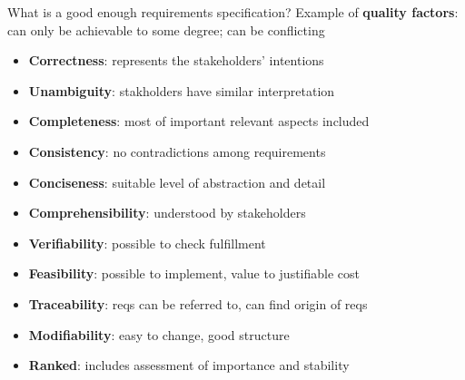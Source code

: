 
\begin{Slide}{What is a good enough requirements specification?}
Example of \textbf{quality factors}:\\can only be achievable to some degree; can be conflicting
\begin{itemize}
\item \textbf{Correctness}: represents the stakeholders' intentions
\item \textbf{Unambiguity}: stakholders have similar interpretation
\item \textbf{Completeness}: most of important relevant aspects included
\item \textbf{Consistency}: no contradictions among requirements
\item \textbf{Conciseness}: suitable level of abstraction and detail 
\item \textbf{Comprehensibility}: understood by stakeholders 
\item \textbf{Verifiability}: possible to check fulfillment 
\item \textbf{Feasibility}: possible to implement, value to justifiable cost 
\item \textbf{Traceability}: reqs can be referred to, can find origin of reqs
\item \textbf{Modifiability}: easy to change, good structure
\item \textbf{Ranked}: includes assessment of importance and stability

\end{itemize}
\end{Slide}